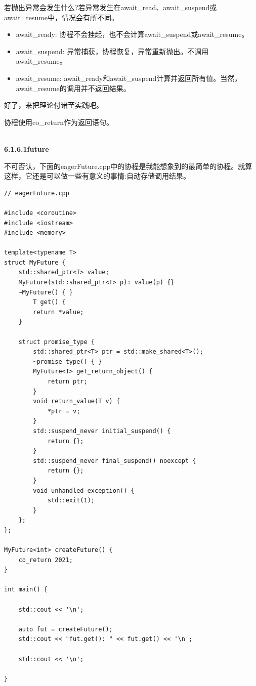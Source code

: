 若抛出异常会发生什么?若异常发生在await\_read、await\_suspend或await\_resume中，情况会有所不同。

\begin{itemize}
\item 
await\_ready: 协程不会挂起，也不会计算await\_suspend或await\_resume。

\item 
await\_suspend: 异常捕获，协程恢复，异常重新抛出。不调用await\_resume。

\item 
await\_resume: await\_ready和await\_suspend计算并返回所有值。当然，await\_resume的调用并不返回结果。
\end{itemize}

好了，来把理论付诸至实践吧。


协程使用co\_return作为返回语句。

\hspace*{\fill} \\ %
\noindent
\textbf{6.1.6.1\hspace{0.2cm}future}

不可否认，下面的eagerFuture.cpp中的协程是我能想象到的最简单的协程。就算这样，它还是可以做一些有意义的事情:自动存储调用结果。

\begin{lstlisting}[style=styleCXX]
// eagerFuture.cpp

#include <coroutine>
#include <iostream>
#include <memory>

template<typename T>
struct MyFuture {
	std::shared_ptr<T> value;
	MyFuture(std::shared_ptr<T> p): value(p) {}
	~MyFuture() { }
		T get() {
		return *value;
	}

	struct promise_type {
		std::shared_ptr<T> ptr = std::make_shared<T>();
		~promise_type() { }
		MyFuture<T> get_return_object() {
			return ptr;
		}
		void return_value(T v) {
			*ptr = v;
		}
		std::suspend_never initial_suspend() {
			return {};
		}
		std::suspend_never final_suspend() noexcept {
			return {};
		}
		void unhandled_exception() {
			std::exit(1);
		}
	};
};

MyFuture<int> createFuture() {
	co_return 2021;
}

int main() {

	std::cout << '\n';
	
	auto fut = createFuture();
	std::cout << "fut.get(): " << fut.get() << '\n';
	
	std::cout << '\n';

}
\end{lstlisting}


